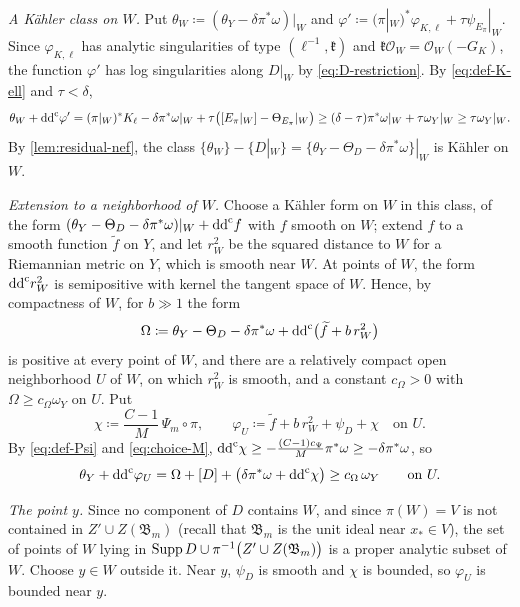\documentclass[11pt,a4paper]{amsart}
\theoremstyle{definition}
\begin{document}
\emph{A K\"ahler class on $W$.} Put
$\theta_W\coloneqq (\theta_Y-\delta\pi^*\omega)|_W$ and
$\varphi'\coloneqq (\pi|_W)^*\varphi_{K,\ell}+\tau\psi_{E_\pi}|_W$. Since
$\varphi_{K,\ell}$ has analytic singularities of type
$(\ell^{-1},\mathfrak k)$ and $\mathfrak k\mathcal O_W=\mathcal O_W(-G_K)$,
the function $\varphi'$ has log singularities along $D|_W$ by
\eqref{eq:D-restriction}. By \eqref{eq:def-K-ell} and $\tau<\delta$,
\[
  \theta_W+\mathrm{dd}^{\mathrm{c}}\varphi'
  =(\pi|_W)^*K_\ell-\delta\pi^*\omega|_W
   +\tau\bigl([E_\pi|_W]-\Theta_{E_\pi}|_W\bigr)
  \ge(\delta-\tau)\pi^*\omega|_W+\tau\omega_Y|_W
  \ge\tau\omega_Y|_W .
\]
By \cref{lem:residual-nef}, the class
$\{\theta_W\}-\{D|_W\}=\{\theta_Y-\Theta_D-\delta\pi^*\omega\}|_W$ is
K\"ahler on $W$.

\emph{Extension to a neighborhood of $W$.} Choose a K\"ahler form on $W$
in this class, of the form
$(\theta_Y-\Theta_D-\delta\pi^*\omega)|_W+\mathrm{dd}^{\mathrm{c}} f$ with $f$ smooth on $W$;
extend $f$ to a smooth function $\widetilde f$ on $Y$, and let $r_W^2$ be
the squared distance to $W$ for a Riemannian metric on $Y$, which is smooth
near $W$. At points of $W$, the form $\mathrm{dd}^{\mathrm{c}} r_W^2$ is semipositive with
kernel the tangent space of $W$. Hence, by compactness of $W$, for $b\gg1$
the form
\[
  \Omega\coloneqq \theta_Y-\Theta_D-\delta\pi^*\omega
  +\mathrm{dd}^{\mathrm{c}}\bigl(\widetilde f+b\,r_W^2\bigr)
\]
is positive at every point of $W$, and there are a relatively compact
open neighborhood $U$ of $W$, on which $r_W^2$ is smooth, and a constant
$c_\Omega>0$ with $\Omega\ge c_\Omega\omega_Y$ on $U$. Put
\[
  \chi\coloneqq \frac{C-1}M\,\Psi_m\circ\pi,
  \qquad
  \varphi_U\coloneqq \widetilde f+b\,r_W^2+\psi_D+\chi\quad\text{on }U.
\]
By \eqref{eq:def-Psi} and \eqref{eq:choice-M},
$\mathrm{dd}^{\mathrm{c}}\chi\ge-\frac{(C-1)c_\Psi}M\pi^*\omega\ge-\delta\pi^*\omega$, so
\[
  \theta_Y+\mathrm{dd}^{\mathrm{c}}\varphi_U
  =\Omega+[D]+\bigl(\delta\pi^*\omega+\mathrm{dd}^{\mathrm{c}}\chi\bigr)
  \ge c_\Omega\,\omega_Y
  \qquad\text{on }U.
\]

\emph{The point $y$.} Since no component of $D$ contains $W$, and since
$\pi(W)=V$ is not contained in $Z'\cup Z(\mathfrak B_m)$ (recall that
$\mathfrak B_m$ is the unit ideal near $x_*\in V$), the set of points of
$W$ lying in $\operatorname{Supp} D\cup\pi^{-1}\bigl(Z'\cup Z(\mathfrak B_m)\bigr)$ is a
proper analytic subset of $W$. Choose $y\in W$ outside it. Near $y$,
$\psi_D$ is smooth and $\chi$ is bounded, so $\varphi_U$ is bounded near
$y$.
\end{document}
